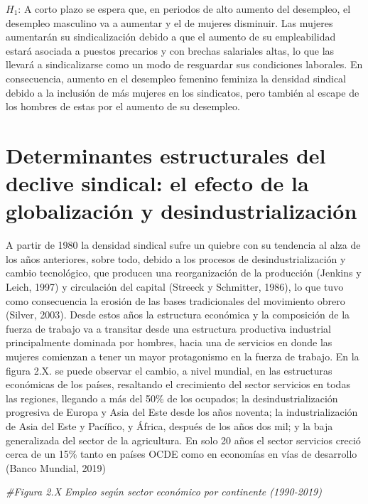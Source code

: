 \documentclass[
]{book}
\newenvironment{Shaded}{\begin{snugshade}}{\end{snugshade}}
\newcommand{\CommentTok}[1]{\textcolor[rgb]{0.56,0.35,0.01}{\textit{#1}}}
\begin{document}
\(H_{1}\): A corto plazo se espera que, en periodos de alto aumento del desempleo, el desempleo masculino va a aumentar y el de mujeres disminuir. Las mujeres aumentarán su sindicalización debido a que el aumento de su empleabilidad estará asociada a puestos precarios y con brechas salariales altas, lo que las llevará a sindicalizarse como un modo de resguardar sus condiciones laborales. En consecuencia, aumento en el desempleo femenino feminiza la densidad sindical debido a la inclusión de más mujeres en los sindicatos, pero también al escape de los hombres de estas por el aumento de su desempleo.

\hypertarget{determinantes-estructurales-del-declive-sindical-el-efecto-de-la-globalizaciuxf3n-y-desindustrializaciuxf3n}{%
\section{Determinantes estructurales del declive sindical: el efecto de la globalización y desindustrialización}\label{determinantes-estructurales-del-declive-sindical-el-efecto-de-la-globalizaciuxf3n-y-desindustrializaciuxf3n}}

A partir de 1980 la densidad sindical sufre un quiebre con su tendencia al alza de los años anteriores, sobre todo, debido a los procesos de desindustrialización y cambio tecnológico, que producen una reorganización de la producción (Jenkins y Leich, 1997) y circulación del capital (Streeck y Schmitter, 1986), lo que tuvo como consecuencia la erosión de las bases tradicionales del movimiento obrero (Silver, 2003). Desde estos años la estructura económica y la composición de la fuerza de trabajo va a transitar desde una estructura productiva industrial principalmente dominada por hombres, hacia una de servicios en donde las mujeres comienzan a tener un mayor protagonismo en la fuerza de trabajo.
En la figura 2.X. se puede observar el cambio, a nivel mundial, en las estructuras económicas de los países, resaltando el crecimiento del sector servicios en todas las regiones, llegando a más del 50\% de los ocupados; la desindustrialización progresiva de Europa y Asia del Este desde los años noventa; la industrialización de Asia del Este y Pacífico, y África, después de los años dos mil; y la baja generalizada del sector de la agricultura. En solo 20 años el sector servicios creció cerca de un 15\% tanto en países OCDE como en economías en vías de desarrollo (Banco Mundial, 2019)

\begin{Shaded}
\begin{Highlighting}[]
\CommentTok{#Figura 2.X Empleo según sector económico por continente (1990-2019)}
\end{Highlighting}
\end{Shaded}
\end{document}
